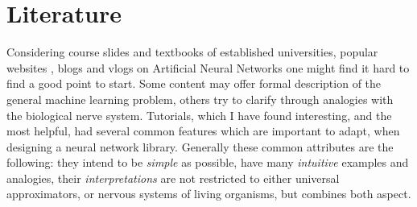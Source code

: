 \chapter{Literature}


Considering course slides \cite{stanfordlectures, oxfordlectures} and textbooks \cite{Goodfellow-et-al-2016-Book, werbos1994roots, bengio2009learning} of established universities, popular websites \cite{deeplearningdotnet, pedregosa2011scikit}, blogs \cite{gibiansky, karpathyblog} and vlogs \cite{vlog1} on Artificial Neural Networks one might find it hard to find a good point to start. 
Some content may offer formal description of the general machine learning problem, others try to clarify through analogies with the biological nerve system.
Tutorials, which I have found interesting, and the most helpful, had several common features which are important to adapt, when designing a neural network library. 
Generally these common attributes are the following: 
they intend to be \emph{simple} as possible, 
have many \emph{intuitive} examples and analogies,
their \emph{interpretations} are not restricted to either universal approximators, or nervous systems of living organisms, but combines both aspect.